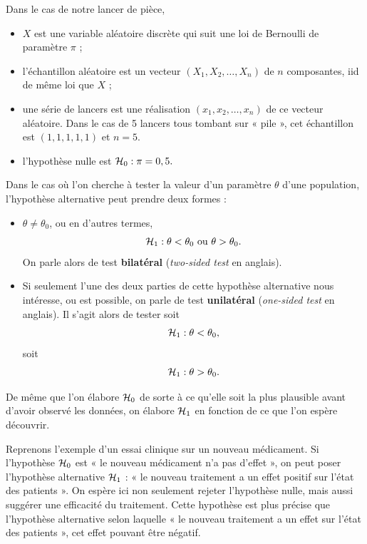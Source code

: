 \begin{exemple}
	Dans le cas de notre lancer de pièce,
	\begin{itemize}
		\item $X$ est une variable aléatoire discrète qui suit une loi de Bernoulli
		de paramètre $\pi$ ;
		\item l'échantillon aléatoire est un vecteur $(X_1, X_2, \dots, X_n)$ de $n$
		composantes, iid de même loi que $X$ ;
		\item une série de lancers est une réalisation $(x_1, x_2, \dots, x_n)$ de ce
		vecteur aléatoire. Dans le cas de 5 lancers tous tombant sur « pile »,
		cet échantillon est $(1, 1, 1, 1, 1)$ et $n=5.$
		\item l'hypothèse nulle est $\mathcal{H}_0: \pi = 0,5.$
	\end{itemize}
\end{exemple}

Dans le cas où l'on cherche à tester la valeur d'un paramètre $\theta$ d'une
population, l'hypothèse alternative peut prendre deux formes :
\begin{itemize}
	\item $\theta \neq \theta_0$, ou en d'autres termes, 
	\begin{equation}
		\label{eq:h1_bilateral}
		\mathcal{H}_1: \theta < \theta_0 \text{ ou } \theta > \theta_0.
	\end{equation}
	On parle alors de test \textbf{bilatéral} (\textit{two-sided test} en
	anglais).
	\item Si seulement l'une des deux parties de cette hypothèse alternative nous
	intéresse, ou est possible, on parle de test \textbf{unilatéral}
	(\textit{one-sided test} en anglais). Il s'agit alors de tester soit
	\begin{equation}
		\label{eq:h1_unilateral_gauche}
		\mathcal{H}_1: \theta < \theta_0,
	\end{equation}
	soit
	\begin{equation}
		\label{eq:h1_unilateral_droite}
		\mathcal{H}_1:  \theta > \theta_0.
	\end{equation}
\end{itemize}

De même que l'on élabore $\mathcal{H}_0$ de sorte à ce qu'elle soit la plus plausible
avant d'avoir observé les données, on élabore $\mathcal{H}_1$ en fonction de ce que
l'on espère découvrir. 

Reprenons l'exemple d'un essai clinique sur un nouveau médicament. Si
l'hypothèse $\mathcal{H}_0$ est « le nouveau médicament n'a pas d'effet », on peut
poser l'hypothèse alternative $\mathcal{H}_1$ : « le nouveau traitement a un effet
positif sur l'état des patients ». On espère ici non seulement rejeter
l'hypothèse nulle, mais aussi suggérer une efficacité du traitement. Cette
hypothèse est plus précise que l'hypothèse alternative selon laquelle « le
nouveau traitement a un effet sur l'état des patients », cet effet pouvant être
négatif.

